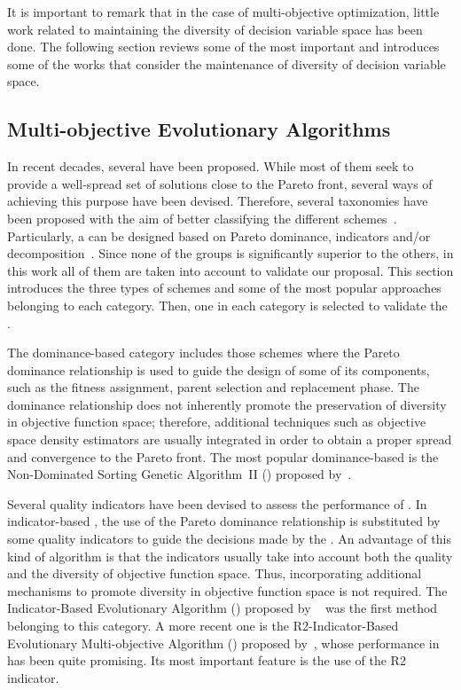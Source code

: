 It is important to remark that in the case of multi-objective optimization, little work related to maintaining the 
diversity of decision variable space has been done.
%
The following section reviews some of the most important \MOEAS{} and introduces some of the works that consider
the maintenance of diversity of decision variable space.

\subsection{Multi-objective Evolutionary Algorithms}

In recent decades, several \MOEAS{} have been proposed. 
%
While most of them seek to provide a well-spread set of solutions close to the Pareto front,
several ways of achieving this purpose have been devised.
%
Therefore, several taxonomies have been proposed with the aim of better classifying the different 
schemes~\citep{Joel:BOOK_MOEAs}.
%
Particularly, a \MOEA{} can be designed based on Pareto dominance, indicators and/or decomposition~\citep{Joel:StateArt}.
%
Since none of the groups is significantly superior to the others, in this work all of them are taken into account to validate
our proposal.
%
This section introduces the three types of schemes and some of the most popular approaches belonging to each category.
%
Then, one \MOEA{} in each category is selected to validate the \VSDMOEA{}.

The dominance-based category includes those schemes where the Pareto dominance relationship is used to guide the 
design of some of its components, such as the fitness assignment, parent selection and replacement phase.
%
The dominance relationship does not inherently promote the preservation of diversity in objective function space; 
therefore, additional techniques such as objective space density estimators are usually integrated in order to obtain 
a proper spread and convergence to the Pareto front.
%
The most popular dominance-based \MOEA{} is the Non-Dominated Sorting Genetic Algorithm~II (\NSGAII{}) proposed by~\cite{Joel:NSGAII}.
%

Several quality indicators have been devised to assess the performance of \MOEAS{}.
%
In indicator-based \MOEAS{}, the use of the Pareto dominance relationship is substituted by some quality indicators 
to guide the decisions made by the \MOEA{}.
%
An advantage of this kind of algorithm is that the indicators usually take into account both the quality and 
the diversity of objective function space. Thus, incorporating additional mechanisms to promote diversity in 
objective function space is not required.
%
The Indicator-Based Evolutionary Algorithm (\IBEA{}) proposed by ~\cite{Joel:IBEA} was the first method belonging to this category.
%
A more recent one is the R2-Indicator-Based Evolutionary Multi-objective Algorithm (\RMOEA{}) proposed by~\cite{trautmann2013r2}, 
whose performance in \MOPS{} has been quite promising.
%
Its most important feature is the use of the R2 indicator.


